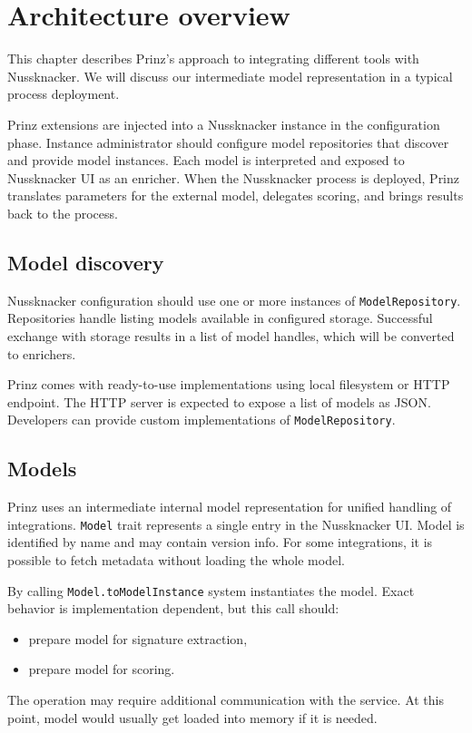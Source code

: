 \chapter{Architecture overview}
\label{chap:arch}

This chapter describes Prinz's approach to integrating different tools with Nussknacker.
We will discuss our intermediate model representation in a typical process deployment.

Prinz extensions are injected into a Nussknacker instance in the configuration phase.
Instance administrator should configure model repositories that discover and provide model instances.
Each model is interpreted and exposed to Nussknacker UI as an enricher.
When the Nussknacker process is deployed, Prinz translates parameters for the external model, delegates scoring, and brings results back to the process.

\section{Model discovery}

Nussknacker configuration should use one or more instances of \texttt{ModelRepository}.
Repositories handle listing models available in configured storage.
Successful exchange with storage results in a list of model handles, which will be converted to enrichers.

Prinz comes with ready-to-use implementations using local filesystem or HTTP endpoint.
The HTTP server is expected to expose a list of models as JSON.
Developers can provide custom implementations of \texttt{ModelRepository}.

\section{Models}

Prinz uses an intermediate internal model representation for unified handling of integrations.
\texttt{Model} trait represents a single entry in the Nussknacker UI.
Model is identified by name and may contain version info.
For some integrations, it is possible to fetch metadata without loading the whole model.

By calling \texttt{Model.toModelInstance} system instantiates the model.
Exact behavior is implementation dependent, but this call should:
\begin{itemize}
    \item prepare model for signature extraction,
    \item prepare model for scoring.
\end{itemize}
The operation may require additional communication with the service.
At this point, model would usually get loaded into memory if it is needed.

